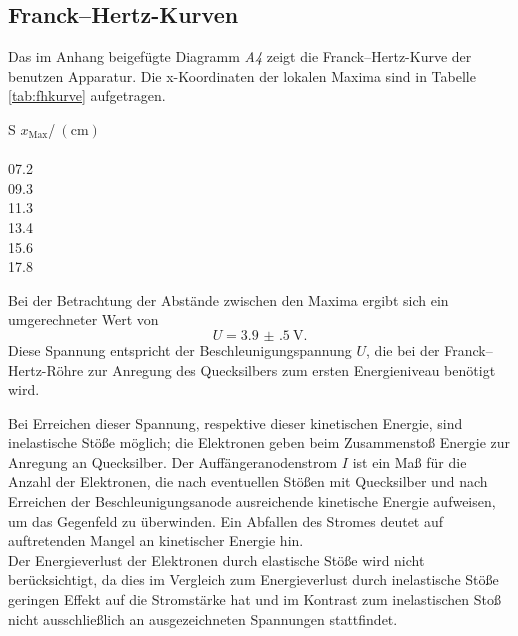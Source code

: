 \subsection{Franck--Hertz-Kurven} %
\label{sec:fhk}
Das im Anhang beigefügte Diagramm \emph{A4} zeigt die Franck--Hertz-Kurve der benutzen Apparatur.
Die x-Koordinaten der lokalen Maxima sind in Tabelle \ref{tab:fhkurve} aufgetragen.\\
\begin{table}
	\centering
		\begin{tabular}{S}
		\toprule
		{$x_\text{Max}$/$\:(\si{\centi\meter})$}\\
		\\
			07.2\\
			09.3\\
			11.3\\
			13.4\\
			15.6\\
			17.8
		\end{tabular}
	\caption{x-Koordinaten der Maxima der Franck--Hertz-Kurve, ausgelesen aus Appendix \emph{A4}.}
	\label{tab:fhkurve}
\end{table}
Bei der Betrachtung der Abstände zwischen den Maxima ergibt sich ein umgerechneter Wert von
\begin{equation}
	U=\SI{3.9(5)}{\volt}.
\end{equation}
Diese Spannung entspricht der Beschleunigungspannung $U$, die bei der Franck--Hertz-Röhre zur Anregung des Quecksilbers zum ersten Energieniveau benötigt wird.

Bei Erreichen dieser Spannung, respektive dieser kinetischen Energie, sind inelastische Stöße möglich; die Elektronen geben beim Zusammenstoß Energie zur Anregung an Quecksilber.
Der Auffängeranodenstrom $I$ ist ein Maß für die Anzahl der Elektronen, die nach eventuellen Stößen mit Quecksilber und nach Erreichen der Beschleunigungsanode ausreichende kinetische Energie aufweisen, um das Gegenfeld zu überwinden.
Ein Abfallen des Stromes deutet auf auftretenden Mangel an kinetischer Energie hin.\\
Der Energieverlust der Elektronen durch elastische Stöße wird nicht berücksichtigt, da dies im Vergleich zum Energieverlust durch inelastische Stöße geringen Effekt auf die Stromstärke hat und im Kontrast zum inelastischen Stoß nicht ausschließlich an ausgezeichneten Spannungen stattfindet.

